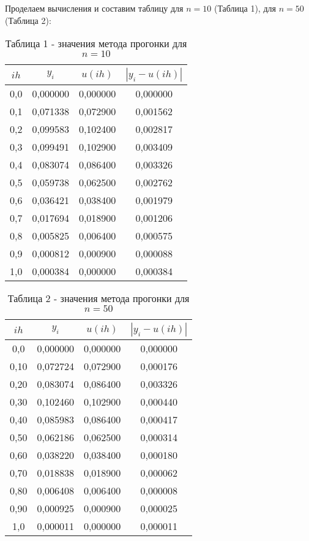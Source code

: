 \documentclass[a4paper,12pt]{article}
\begin{document}
{Проделаем вычисления и составим таблицу для $n = 10$ (Таблица 1), для $n = 50$ (Таблица 2):
\begin{table}[h]
    \centering
    \begin{tabular}{|c|c|c|c|}
        \hline
        $ih$ & $y_i$ & $u(ih)$ & $\left|y_i - u(ih)\right|$\\
        \hline
        0,0 & 0,000000  & 0,000000  & 0,000000  \\           
        \hline
        0,1 & 0,071338  & 0,072900  & 0,001562  \\
        \hline
        0,2 & 0,099583  & 0,102400  & 0,002817  \\
        \hline
        0,3 & 0,099491  & 0,102900  & 0,003409  \\
        \hline
        0,4 & 0,083074  & 0,086400  & 0,003326  \\
        \hline
        0,5 & 0,059738  & 0,062500  & 0,002762  \\
        \hline
        0,6 & 0,036421  & 0,038400  & 0,001979  \\
        \hline
        0,7 & 0,017694  & 0,018900  & 0,001206  \\
        \hline
        0,8 & 0,005825  & 0,006400  & 0,000575  \\
        \hline
        0,9 & 0,000812  & 0,000900  & 0,000088  \\
        \hline
        1,0 & 0,000384  & 0,000000  & 0,000384  \\
        \hline
    \end{tabular}
    \caption*{\small{Таблица 1 - значения метода прогонки для $n = 10$}}
\end{table}
\clearpage
\begin{table}[h]
    \centering
    \begin{tabular}{|c|c|c|c|}
        \hline
        $ih$ & $y_i$ & $u(ih)$ & $\left|y_i - u(ih)\right|$\\
        \hline
        0,0 & 0,000000  & 0,000000  & 0,000000  \\           
        \hline
        0,10 & 0,072724  & 0,072900  & 0,000176  \\
        \hline
        0,20 & 0,083074  & 0,086400  & 0,003326  \\
        \hline
        0,30 & 0,102460  & 0,102900  & 0,000440  \\
        \hline
        0,40 & 0,085983  & 0,086400  & 0,000417  \\
        \hline
        0,50 & 0,062186  & 0,062500  & 0,000314  \\
        \hline
        0,60 & 0,038220  & 0,038400  & 0,000180  \\
        \hline
        0,70 & 0,018838  & 0,018900  & 0,000062  \\
        \hline
        0,80 & 0,006408  & 0,006400  & 0,000008  \\
        \hline
        0,90 & 0,000925  & 0,000900  & 0,000025  \\
        \hline
        1,0 & 0,000011  & 0,000000  & 0,000011  \\
        \hline
    \end{tabular}
    \caption*{\small{Таблица 2 - значения метода прогонки для $n = 50$}}
\end{table}
}
\end{document}
